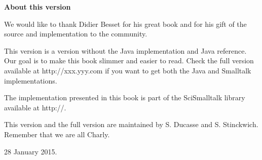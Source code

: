 \documentclass[twoside]{book}
\begin{document}
\fi

\begin{titlepage}
\hbox{\/}\vspace{12 ex} {\Huge \bf About this version}

\vspace{10 ex}
We would like to thank Didier Besset for his great book and for his gift of the source and implementation to the community. 


This version is a version without the Java implementation and Java reference. Our goal is to make this book slimmer and easier to read. Check the full version available at http://xxx.yyy.com if you want to get both the Java and Smalltalk implementations.

The implementation presented in this book is part of the SciSmalltalk library available at
http://. 


This version and the full version are maintained by S. Ducasse and S. Stinckwich.
Remember that we are all Charly.

\vspace{5 ex}
28 January 2015.
\end{titlepage}
\end{document}
